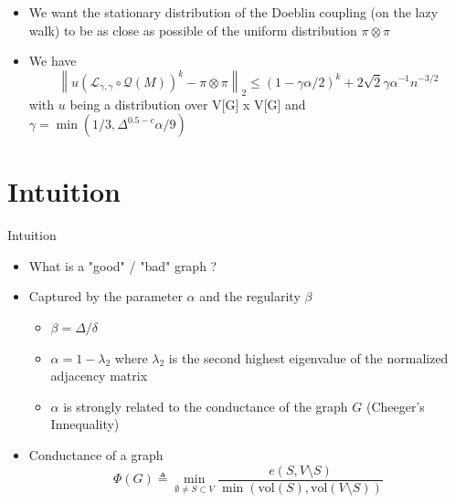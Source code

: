 \documentclass{beamer}
\newcommand{\norm}[1]{\left\lVert#1\right\rVert}
\begin{document}
\begin{frame}
\begin{itemize}


 \item We want the stationary distribution of the Doeblin coupling (on the lazy walk) to be as close as possible of the uniform distribution $\pi \otimes \pi$

\item We have 
\[
  \norm{u(\mathcal L_{\gamma,\gamma} \circ \mathcal Q(M))^k - \pi \otimes \pi}_2 \leq (1 - \gamma \alpha / 2)^k + 2 \sqrt 2 \gamma \alpha^{-1} n^{-3/2}
\]
with $u$ being a distribution over V[G] x V[G] and $\gamma = \min(1/3, \Delta^{0.5-c}\alpha/9)$

\end{itemize}
\end{frame}


\section{Intuition}

\frame{\sectionpage}

\begin{frame}{Intuition}
  \begin{itemize}
    \item What is a "good" / "bad" graph ? 
    \pause
    \item Captured by the parameter $\alpha$ and the regularity $\beta$
    \begin{itemize}
      \item $\beta = \Delta / \delta$
      \item $\alpha = 1 - \lambda_2$ where $\lambda_2$ is the second highest eigenvalue of the normalized adjacency matrix
      \item $\alpha$ is strongly related to the conductance of the graph $G$ (Cheeger's Innequality)
    \end{itemize}
    \pause
    \item Conductance of a graph
      \[
        \Phi(G) \triangleq \min_{\emptyset \not = S \subset V} \frac{e(S, V \setminus S)}{\min(\text{vol}(S), \text{vol}(V \setminus S))}
      \]
  \end{itemize}
\end{frame}
\end{document}
